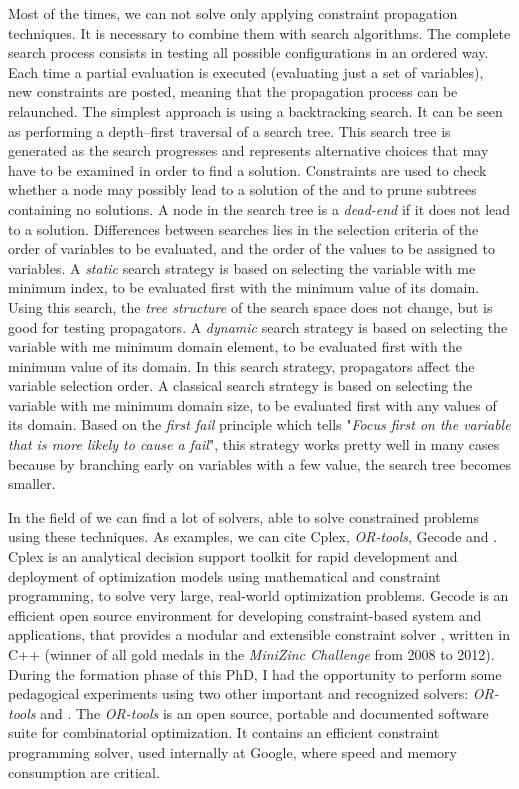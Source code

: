 Most of the times, we can not solve \csps{} only applying constraint propagation techniques. It is necessary to combine them with search algorithms. The complete search process consists in testing all possible configurations in an ordered way. Each time a partial evaluation is executed (evaluating just a set of variables), new constraints are posted, meaning that the propagation process can be relaunched. The simplest approach is using a backtracking search. It can be seen as performing a depth--first traversal of a search tree. This search tree is generated as the search progresses and represents alternative choices that may have to be examined in order to find a solution. Constraints are used to check whether a node may possibly lead to a solution of the \csp{} and to prune subtrees containing no solutions. A node in the search
tree is a \textit{dead-end} if it does not lead to a solution. Differences between searches lies in the selection criteria of the order of variables to be evaluated, and the order of the values to be assigned to variables. A \textit{static} search strategy is based on selecting the variable with me minimum index, to be evaluated first with the minimum value of its domain. Using this search, the \textit{tree structure} of the search space does not change, but is good for testing propagators. A \textit{dynamic} search strategy is based on selecting the variable with me minimum domain element, to be evaluated first with the minimum value of its domain. In this search strategy, propagators affect the variable selection order. A classical search strategy is based on selecting the variable with me minimum domain size, to be evaluated first with any values of its domain. Based on the \textit{first fail} principle which tells "\textit{Focus first on the variable that is more likely to cause a fail}",  this strategy works pretty well in many cases because by branching early on variables with a few value, the search tree becomes smaller.

In the field of \cp{} we can find a lot of solvers, able to solve constrained problems using these techniques. As examples, we can cite {\sc Cplex}, \textit{OR-tools}, {\sc Gecode} and \choco. {\sc Cplex} is an analytical decision support toolkit for rapid development and deployment of optimization models using mathematical and constraint programming, to solve very large, real-world optimization problems. {\sc Gecode} is an efficient open source environment for developing constraint-based system and applications, that provides a modular and extensible constraint solver \cite{Gecode}, written in C++ (winner of all gold medals in the \textit{MiniZinc Challenge} from 2008 to 2012). During the formation phase of this PhD, I had the opportunity to perform some pedagogical experiments using two other important and recognized solvers: \textit{OR-tools} and \choco. The \textit{OR-tools} is an open source, portable and documented software suite for combinatorial optimization. It contains an efficient  constraint programming solver, used internally at Google, where speed and memory consumption are critical.

